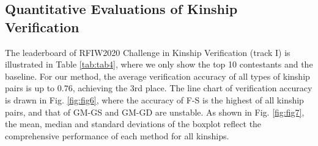 \documentclass[a4paper, 10pt, conference]{ieeeconf}      %
\begin{document}
\subsection{Quantitative Evaluations of Kinship Verification}

The leaderboard of RFIW2020 Challenge in Kinship Verification (track I) is illustrated in Table  \ref{tab:tab4}, where we only show the top 10 contestants and the baseline. For our method, the average verification accuracy of all types of kinship pairs is up to $0.76$, achieving the 3rd place. The line chart of verification accuracy is drawn in Fig. \ref{fig:fig6}, where the accuracy of F-S is the highest of all kinship pairs, and that of GM-GS and GM-GD are unstable. As shown in Fig. \ref{fig:fig7}, the mean, median and standard deviations of the boxplot reflect the comprehensive performance of each method for all kinships.
\end{document}
